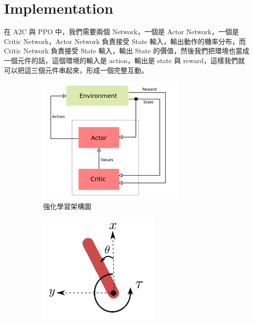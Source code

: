 \section{Implementation}

在 A2C 與 PPO 中，我們需要兩個 Network，一個是 Actor Network，一個是 Critic Network，Actor Network 負責接受 State 輸入，輸出動作的機率分布，而 Critic Network 負責接受 State 輸入，輸出 State 的價值，然後我們把環境也當成一個元件的話，這個環境的輸入是 action，輸出是 state 與 reward，這樣我們就可以把這三個元件串起來，形成一個完整互動。

\begin{figure}[h]
    \centering
    \begin{subfigure}[b]{0.48\textwidth}
        \centering
        \includegraphics[width=\textwidth]{figures/RL_structure.png}
        \caption{強化學習架構圖}
        \label{fig:RL_structure}
    \end{subfigure}
    \hfill
    \begin{subfigure}[b]{0.48\textwidth}
        \centering
        \includegraphics[width=\textwidth]{figures/pendulum.png}

\end{subfigure}
\end{figure}
